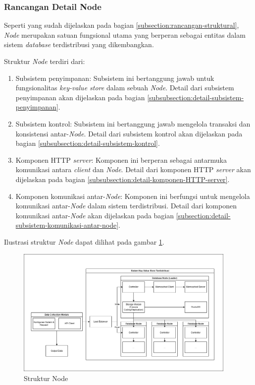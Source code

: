 \subsubsection{Rancangan Detail Node}
\label{subsubsection:detail-node}

Seperti yang sudah dijelaskan pada bagian \ref{subsection:rancangan-struktural}, \textit{Node} merupakan satuan fungsional utama yang berperan sebagai entitas dalam sistem \textit{database} terdistribusi yang dikembangkan.

Struktur \textit{Node} terdiri dari:

\begin{enumerate}
    \item Subsistem penyimpanan: Subsistem ini bertanggung jawab untuk fungsionalitas \textit{key-value store} dalam sebuah \textit{Node}. Detail dari subsistem penyimpanan akan dijelaskan pada bagian \ref{subsubsection:detail-subsistem-penyimpanan}.
    \item Subsistem kontrol: Subsistem ini bertanggung jawab mengelola transaksi dan konsistensi antar-\textit{Node}. Detail dari subsistem kontrol akan dijelaskan pada bagian \ref{subsubsection:detail-subsistem-kontrol}.
    \item Komponen HTTP \textit{server}: Komponen ini berperan sebagai antarmuka komunikasi antara \textit{client} dan \textit{Node}. Detail dari komponen HTTP \textit{server} akan dijelaskan pada bagian \ref{subsubsection:detail-komponen-HTTP-server}.
    \item Komponen komunikasi antar-\textit{Node}: Komponen ini berfungsi untuk mengelola komunikasi antar-\textit{Node} dalam sistem terdistribusi. Detail dari komponen komunikasi antar-\textit{Node} akan dijelaskan pada bagian \ref{subsection:detail-subsistem-komunikasi-antar-node}.
\end{enumerate}

Ilustrasi struktur \textit{Node} dapat dilihat pada gambar \ref{fig:node-structure}.

\begin{figure}[ht]
    \centering
    \includegraphics[width=0.95\textwidth]{resources/chapter-3/general-architecture.png}
    \caption{Struktur Node}
    \label{fig:node-structure}
\end{figure}